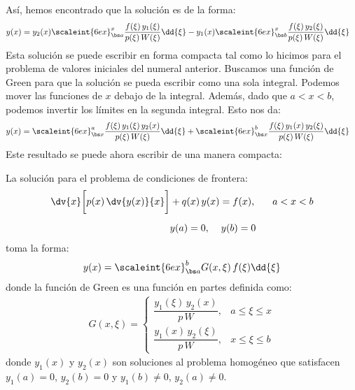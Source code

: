 Así, hemos encontrado que la solución es de la forma:
\begin{align}
y (x) &= y_{2} (x) \scaleint{6ex}_{\bs a}^{x} \dfrac{f (\xi) \, y_{1} (\xi)}{p (\xi) \, W (\xi)} \dd{\xi} - y_{1} (x) \scaleint{6ex}_{\bs b}^{x} \dfrac{f (\xi) \, y_{2} (\xi)}{p (\xi) \, W (\xi)} \dd{\xi}
\label{eq:ecuacion_07_29}
\end{align}
Esta solución se puede escribir en forma compacta tal como lo hicimos para el problema de valores iniciales del numeral anterior. Buscamos una función de Green para que la solución se pueda escribir como una sola integral. Podemos mover las funciones de $x$ debajo de la integral. Además, dado que $a < x < b$, podemos invertir los límites en la segunda integral. Esto nos da:
\begin{align}
y (x) &= \scaleint{6ex}_{\bs x}^{a} \dfrac{f (\xi) \, y_{1} (\xi) \, y_{2} (x)}{p (\xi) \, W (\xi)} \dd{\xi} + \scaleint{6ex}_{\bs x}^{b} \dfrac{f (\xi) \, y_{1} (x) \, y_{2} (\xi)}{p (\xi) \, W (\xi)} \dd{\xi}
\label{eq:ecuacion_07_30}
\end{align}
Este resultado se puede ahora escribir de una manera compacta:
\begin{tcolorbox}[title={\centering Solución para problema de CDF con la función de Green}]

La solución para el problema de condiciones de frontera:
\begin{align}
\begin{aligned}
\dv{x} \bigg[ p (x) \, \dv{y (x)}{x} \bigg] &+ q (x) \, y (x) = f (x), \hspace{0.6cm} a < x < b \\[0.5em]
&y (a) = 0, \hspace{0.4cm} y (b) = 0
\end{aligned}
\label{eq:ecuacion_07_31}
\end{align}
toma la forma:
\begin{align}
y (x) = \scaleint{6ex}_{\bs a}^{b} G (x, \xi) \, f (\xi) \dd{\xi}
\label{eq:ecuacion_07_32}
\end{align}
donde la función de Green es una función en partes definida como:
\begin{align}
G (x, \xi) = \begin{cases}
\dfrac{y_{1} (\xi) \, y_{2} (x)}{p \, W}, & a \leq \xi \leq x \\[0.5em]
\dfrac{y_{1} (x) \, y_{2} (\xi)}{p \, W}, & x \leq \xi \leq b
\end{cases}
\label{eq:ecuacion_07_33}
\end{align}
donde $y_{1} (x)$ y $y_{2} (x)$ son soluciones al problema homogéneo que satisfacen $y_{1} (a) = 0$, $y_{2} (b) = 0$ y $y_{1} (b) \neq 0$, $y_{2} (a) \neq 0$.
\end{tcolorbox}

